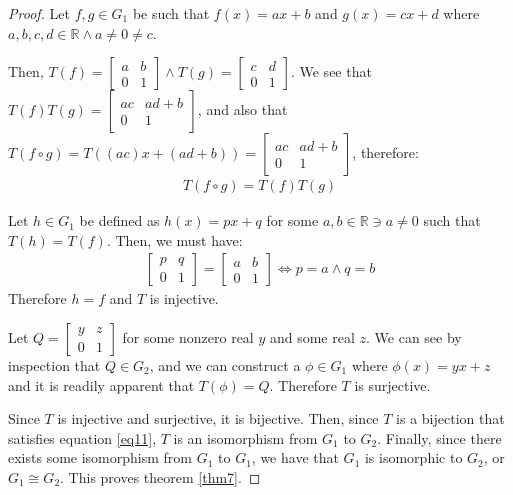 \documentclass[12pt]{article}
\newcommand{\reals}{\mathbb{R}}
\newcommand{\glmatrix}[4]{\ensuremath{\begin{bmatrix} #1 & #2 \\ #3 & #4 \end{bmatrix}}}
\begin{document}
\begin{proof}
	Let $f,g \in G_1$ be such that $f(x) = ax + b$ and $g(x) = cx + d$
	where $a,b,c,d \in \reals \land a \neq 0 \neq c$.

	\sloppy
	Then, $T(f) = \glmatrix{a}{b}{0}{1} \land T(g) = \glmatrix{c}{d}{0}{1}$.
	We see that $T(f)T(g) = \glmatrix{ac}{ad + b}{0}{1}$,
	and also that $T(f \circ g) = T((ac)x + (ad + b)) = \glmatrix{ac}{ad + b}{0}{1}$,
	therefore:
	\begin{align} \label{eq11}
		T(f \circ g) = T(f)T(g)
	\end{align}

	Let $h \in G_1$ be defined as $h(x) = px + q$ for some $a,b \in \reals \ni a \neq 0$
	such that $T(h) = T(f)$. Then, we must have:
	\begin{align}
		\glmatrix{p}{q}{0}{1} = \glmatrix{a}{b}{0}{1} \iff p = a \land q = b
	\end{align}
	Therefore $h = f$ and $T$ is injective.
	
	Let $Q = \glmatrix{y}{z}{0}{1}$ for some nonzero real $y$ and some real $z$.
	We can see by inspection that $Q \in G_2$, and
	we can construct a $\phi \in G_1$ where $\phi(x) = yx + z$ and it is
	readily apparent that $T(\phi) = Q$.
	Therefore $T$ is surjective.

	Since $T$ is injective and surjective, it is bijective.
	Then, since $T$ is a bijection that satisfies equation \ref{eq11},
	$T$ is an isomorphism from $G_1$ to $G_2$.
	Finally, since there exists some isomorphism from $G_1$ to $G_1$,
	we have that $G_1$ is isomorphic to $G_2$, or $G_1 \cong G_2$.
	This proves theorem \ref{thm7}.


\end{proof}
\end{document}
